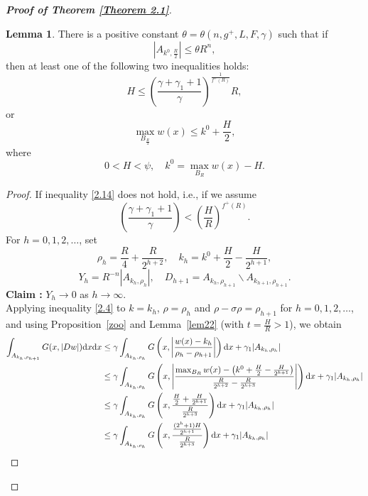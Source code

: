 \documentclass[10pt,reqno]{amsart}
\newcommand *\w{^\wedge}
\theoremstyle{definition}
\newtheorem{lemma}[theorem]{Lemma}
\numberwithin{equation}{section}
\begin{document}
\begin{proof}[\textbf{Proof of Theorem \ref{Theorem 2.1}}]
\begin{lemma}
There is a positive constant \(\theta = \theta(n,g^+, L, F,\gamma)\) such that if
\begin{equation}\label{2.13}
|A_{k^0, \frac{R}{2}}| \leq \theta R^n,
\end{equation}
then at least one of the following two inequalities hol{\rm d}s:
\begin{equation}\label{2.14}
H \leq \left( \frac{\gamma  + \gamma_1 + 1}{\gamma} \right)^{\frac{1}{f^+(R)}} R,
\end{equation}
or
\begin{equation}\label{2.15}
\max_{B_{\frac{R}{4}}} w(x) \leq k^0 + \frac{H}{2},
\end{equation}
where
\[
0 < H < \psi, \quad k^0 = \max_{B_R} w(x) - H.
\]
\end{lemma}

\begin{proof}
If inequality \eqref{2.14} does not hold, i.e., if we assume
\begin{equation}\label{2.144}
\left( \frac{\gamma + \gamma_1 + 1}{\gamma} \right) <  \left(\frac{H}{R}\right)^{f^+(R)}.
\end{equation}
For \(h = 0, 1, 2, \ldots\), set
\[
\rho_h = \frac{R}{4} + \frac{R}{2^{h+2}}, \quad k_h = k^0 + \frac{H}{2} - \frac{H}{2^{h+1}},
\]
\[
Y_h = R^{-n}|A_{k_h, \rho_h}|, \quad D_{h+1} = A_{k_h, \rho_{h+1}} \backslash A_{k_{h+1}, \rho_{h+1}}.
\]
{\bf Claim :} \(Y_h \to 0\) as \(h \to \infty\).\\
Applying inequality \eqref{2.4} to \(k = k_h\), \(\rho = \rho_h\) and \(\rho - \sigma \rho = \rho_{h+1}\) for \(h = 0, 1, 2, \ldots\), and using Proposition~\ref{zoo} and Lemma~\ref{lem22} (with $t=\frac{H}{R}>1$), we obtain
\begin{align}\label{2.17}
\begin{split}
 \int_{A_{k_h, \rho_{h+1}}} G(x,|Dw|){\rm d}x {\rm d}x
&\leq \gamma \int_{A_{k_h, \rho_h}}G\left(x,\left| \frac{w(x) - k_h}{\rho_h - \rho_{h+1}} \right|\right) {\rm d}x + \gamma_1 |A_{k_h, \rho_h}|\\
& \leq \gamma \int_{A_{k_h, \rho_h}}G\left(x,\left| \frac{\max_{B_R} w(x) - \left( k^0 + \frac{H}{2} - \frac{H}{2^{h+1}}\right)}{\frac{R}{2^{h+2}}-\frac{R}{2^{h+3}}} \right|\right) {\rm d}x + \gamma_1 |A_{k_h, \rho_h}|\\
& \leq \gamma \int_{A_{k_h, \rho_h}}G\left(x, \frac{ \frac{H}{2} + \frac{H}{2^{h+1}}}{\frac{R}{2^{h+3}}} \right) {\rm d}x + \gamma_1 |A_{k_h, \rho_h}|\\
& \leq \gamma \int_{A_{k_h, \rho_h}}G\left(x, \frac{ \frac{(2^{h}+1)H}{2^{h+1}}}{\frac{R}{2^{h+3}}} \right) {\rm d}x + \gamma_1 |A_{k_h, \rho_h}|\\

\end{split}
\end{align}
\end{proof}
\end{proof}
\end{document}
